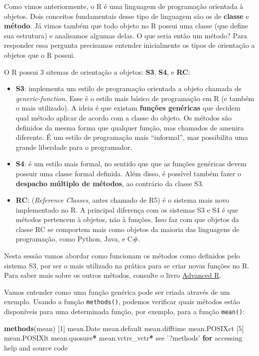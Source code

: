 \documentclass[10pt,a4paper]{book}
\newenvironment{Shaded}{\begin{snugshade}}{\end{snugshade}}
\newcommand{\KeywordTok}[1]{\textcolor[rgb]{0.13,0.29,0.53}{\textbf{#1}}}
\newcommand{\DecValTok}[1]{\textcolor[rgb]{0.00,0.00,0.81}{#1}}
\newcommand{\StringTok}[1]{\textcolor[rgb]{0.31,0.60,0.02}{#1}}
\newcommand{\ControlFlowTok}[1]{\textcolor[rgb]{0.13,0.29,0.53}{\textbf{#1}}}
\newcommand{\OperatorTok}[1]{\textcolor[rgb]{0.81,0.36,0.00}{\textbf{#1}}}
\newcommand{\NormalTok}[1]{#1}
\providecommand{\tightlist}{%
  \setlength{\itemsep}{0pt}\setlength{\parskip}{0pt}}
\begin{document}
Como vimos anteriormente, o R é uma linguagem de programação orientada à
objetos. Dois conceitos fundamentais desse tipo de linguagem são os de
\textbf{classe} e \textbf{método}. Já vimos também que todo objeto no R
possui uma classe (que define sua estrutura) e analisamos algumas delas.
O que seria então um método? Para responder essa pergunta precisamos
entender inicialmente os tipos de orientação a objetos que o R possui.

O R possui 3 sitemas de orientação a objetos: \textbf{S3}, \textbf{S4},
e \textbf{RC}:

\begin{itemize}
\tightlist
\item
  \textbf{S3}: implementa um estilo de programação orientada a objeto
  chamada de \emph{generic-function}. Esse é o estilo mais básico de
  programação em R (e também o mais utilizado). A ideia é que existam
  \textbf{funções genéricas} que decidem qual método aplicar de acordo
  com a classe do objeto. Os métodos são definidos da mesma forma que
  qualquer função, mas chamados de amenira diferente. É um estilo de
  programação mais ``informal'', mas possibilita uma grande liberdade
  para o programador.
\item
  \textbf{S4}: é um estilo mais formal, no sentido que que as funções
  genéricas devem possuir uma classe formal definida. Além disso, é
  possível também fazer o \textbf{despacho múltiplo de métodos}, ao
  contrário da classe S3.
\item
  \textbf{RC}: (\emph{Reference Classes}, antes chamado de R5) é o
  sistema mais novo implementado no R. A principal diferença com os
  sistemas S3 e S4 é que métodos pertencem à objetos, não à funções.
  Isso faz com que objetos da classe RC se comportem mais como objetos
  da maioria das linguagens de programação, como Python, Java, e C\#.
\end{itemize}

Nesta sessão vamos abordar como funcionam os métodos como definidos pelo
sistema S3, por ser o mais utilizado na prática para se criar novas
funções no R. Para saber mais sobre os outros métodos, consulte o livro
\href{http://adv-r.had.co.nz/OO-essentials.html}{Advanced R}.

Vamos entender como uma função genérica pode ser criada através de um
exemplo. Usando a função \texttt{methods()}, podemos verificar quais
métodos estão disponíveis para uma determinada função, por exemplo, para
a função \texttt{mean()}:

\begin{Shaded}
\begin{Highlighting}[]
\KeywordTok{methods}\NormalTok{(mean)}
\NormalTok{[}\DecValTok{1}\NormalTok{] mean.Date        mean.default     mean.difftime    mean.POSIXct    }
\NormalTok{[}\DecValTok{5}\NormalTok{] mean.POSIXlt     mean.quosure}\OperatorTok{*}\StringTok{    }\NormalTok{mean.vctrs_vctr}\OperatorTok{*}
\NormalTok{see }\StringTok{'?methods'} \ControlFlowTok{for}\NormalTok{ accessing help and source code}
\end{Highlighting}
\end{Shaded}
\end{document}
